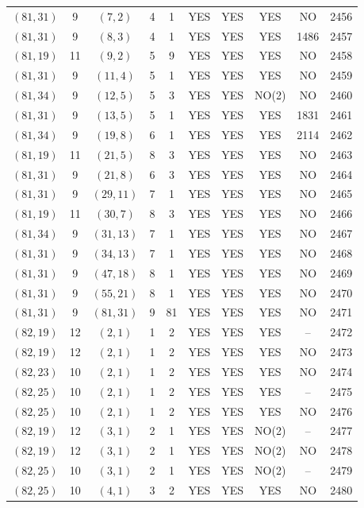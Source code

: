 \begin{longtable}{|c|c|c|c|c|c|c|c|c|c|}
$(81, 31)$ & 9 & $(7, 2)$ & 4 & 1 & YES & YES & YES & NO & 2456\\
$(81, 31)$ & 9 & $(8, 3)$ & 4 & 1 & YES & YES & YES & 1486 & 2457\\
$(81, 19)$ & 11 & $(9, 2)$ & 5 & 9 & YES & YES & YES & NO & 2458\\
$(81, 31)$ & 9 & $(11, 4)$ & 5 & 1 & YES & YES & YES & NO & 2459\\
$(81, 34)$ & 9 & $(12, 5)$ & 5 & 3 & YES & YES & NO(2) & NO & 2460\\
$(81, 31)$ & 9 & $(13, 5)$ & 5 & 1 & YES & YES & YES & 1831 & 2461\\
$(81, 34)$ & 9 & $(19, 8)$ & 6 & 1 & YES & YES & YES & 2114 & 2462\\
$(81, 19)$ & 11 & $(21, 5)$ & 8 & 3 & YES & YES & YES & NO & 2463\\
$(81, 31)$ & 9 & $(21, 8)$ & 6 & 3 & YES & YES & YES & NO & 2464\\
$(81, 31)$ & 9 & $(29, 11)$ & 7 & 1 & YES & YES & YES & NO & 2465\\
$(81, 19)$ & 11 & $(30, 7)$ & 8 & 3 & YES & YES & YES & NO & 2466\\
$(81, 34)$ & 9 & $(31, 13)$ & 7 & 1 & YES & YES & YES & NO & 2467\\
$(81, 31)$ & 9 & $(34, 13)$ & 7 & 1 & YES & YES & YES & NO & 2468\\
$(81, 31)$ & 9 & $(47, 18)$ & 8 & 1 & YES & YES & YES & NO & 2469\\
$(81, 31)$ & 9 & $(55, 21)$ & 8 & 1 & YES & YES & YES & NO & 2470\\
$(81, 31)$ & 9 & $(81, 31)$ & 9 & 81 & YES & YES & YES & NO & 2471\\
$(82, 19)$ & 12 & $(2, 1)$ & 1 & 2 & YES & YES & YES & -- & 2472\\
$(82, 19)$ & 12 & $(2, 1)$ & 1 & 2 & YES & YES & YES & NO & 2473\\
$(82, 23)$ & 10 & $(2, 1)$ & 1 & 2 & YES & YES & YES & NO & 2474\\
$(82, 25)$ & 10 & $(2, 1)$ & 1 & 2 & YES & YES & YES & -- & 2475\\
$(82, 25)$ & 10 & $(2, 1)$ & 1 & 2 & YES & YES & YES & NO & 2476\\
$(82, 19)$ & 12 & $(3, 1)$ & 2 & 1 & YES & YES & NO(2) & -- & 2477\\
$(82, 19)$ & 12 & $(3, 1)$ & 2 & 1 & YES & YES & NO(2) & NO & 2478\\
$(82, 25)$ & 10 & $(3, 1)$ & 2 & 1 & YES & YES & NO(2) & -- & 2479\\
$(82, 25)$ & 10 & $(4, 1)$ & 3 & 2 & YES & YES & YES & NO & 2480\\

\end{longtable}
